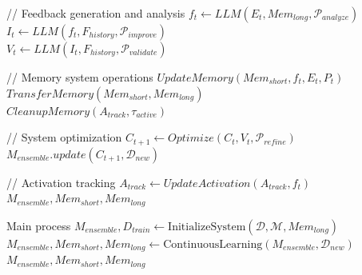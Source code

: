 \documentclass[conference]{IEEEtran}
\begin{document}
\begin{algorithm}[H]
\begin{algorithmic}[1]
            \State // Feedback generation and analysis
            \State $f_t \gets LLM(E_t, Mem_{long}, \mathcal{P}_{analyze})$  \\
            \State $I_t \gets LLM(f_t, F_{history}, \mathcal{P}_{improve})$  \\
            \State $V_t \gets LLM(I_t, F_{history}, \mathcal{P}_{validate})$  \\
            
            \State // Memory system operations
            \State $UpdateMemory(Mem_{short}, f_t, E_t, P_t)$  \\
            \State $TransferMemory(Mem_{short}, Mem_{long})$ \\
            \State $CleanupMemory(A_{track}, \tau_{active})$ \\
            
            \State // System optimization
            \State $C_{t+1} \gets Optimize(C_t, V_t, \mathcal{P}_{refine})$ \\
            \State $M_{ensemble}.update(C_{t+1}, \mathcal{D}_{new})$ \\
            
            \State // Activation tracking
            \State $A_{track} \gets UpdateActivation(A_{track}, f_t)$ \\
        \EndWhile
        \State \Return $M_{ensemble}, Mem_{short}, Mem_{long}$
    \EndFunction
    
    \State Main process
    \State $M_{ensemble}, D_{train} \gets \text{InitializeSystem}(\mathcal{D}, \mathcal{M}, Mem_{long})$
    \State $M_{ensemble}, Mem_{short}, Mem_{long} \gets \text{ContinuousLearning}(M_{ensemble}, \mathcal{D}_{new})$ 
    \State \Return $M_{ensemble}, Mem_{short}, Mem_{long}$
    \end{algorithmic}
\end{algorithm}
\end{document}

